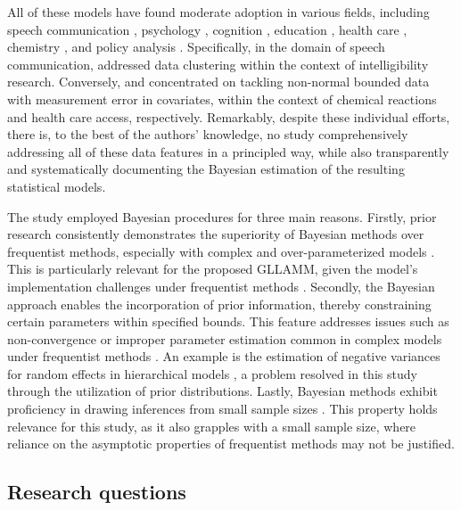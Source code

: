 \documentclass[
  authoryear,
  preprint,
  1p]{elsarticle}
\begin{document}
All of these models have found moderate adoption in various fields,
including speech communication \citep{Boonen_et_al_2021}, psychology
\citep{Unlu_et_al_2017}, cognition
\citep{Verkuilen_et_al_2012, Lopes_et_al_2023}, education
\citep{Pereira_et_al_2020}, health care
\citep{Ghosh_2019, Kangmennaang_et_al_2023}, chemistry
\citep{de_Brito_et_al_2021}, and policy analysis
\citep{Dieteren_et_al_2023, Choi_2023, Zhang_et_al_2023}. Specifically,
in the domain of speech communication, \citet{Boonen_et_al_2021}
addressed data clustering within the context of intelligibility
research. Conversely, \citet{de_Brito_et_al_2021} and
\citet{Kangmennaang_et_al_2023} concentrated on tackling non-normal
bounded data with measurement error in covariates, within the context of
chemical reactions and health care access, respectively. Remarkably,
despite these individual efforts, there is, to the best of the authors'
knowledge, no study comprehensively addressing all of these data
features in a principled way, while also transparently and
systematically documenting the Bayesian estimation of the resulting
statistical models.

{The study employed Bayesian procedures for three main reasons. Firstly,
prior research consistently demonstrates the superiority of Bayesian
methods over frequentist methods, especially with complex and
over-parameterized models \citep{Baker_1998, Kim_et_al_1999}. This is
particularly relevant for the proposed GLLAMM, given the model's
implementation challenges under frequentist methods
\citep{Depaoli_2014}. Secondly, the Bayesian approach enables the
incorporation of prior information, thereby constraining certain
parameters within specified bounds. This feature addresses issues such
as non-convergence or improper parameter estimation common in complex
models under frequentist methods
\citep{Martin_et_al_1975, Seaman_et_al_2011}. An example is the
estimation of negative variances for random effects in hierarchical
models \citep{Holmes_et_al_2019}, a problem resolved in this study
through the utilization of prior distributions. Lastly, Bayesian methods
exhibit proficiency in drawing inferences from small sample sizes
\citep{Baldwin_et_al_2013, Lambert_et_al_2005, Depaoli_2014}. This
property holds relevance for this study, as it also grapples with a
small sample size, where reliance on the asymptotic properties of
frequentist methods may not be justified.}

\subsection{Research questions}\label{sec-I-RQ}
\end{document}

